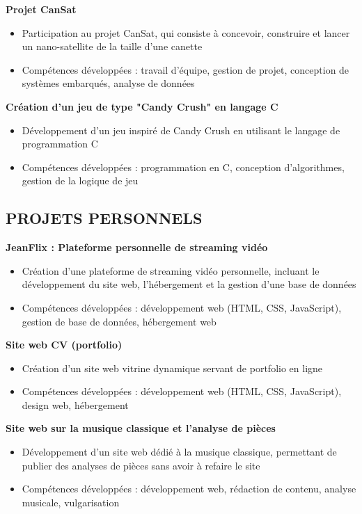 \documentclass{article}
\begin{document}
\textbf{Projet CanSat}
\begin{itemize}
\item Participation au projet CanSat, qui consiste à concevoir, construire et lancer un nano-satellite de la taille d'une canette
\item Compétences développées : travail d'équipe, gestion de projet, conception de systèmes embarqués, analyse de données
\end{itemize}

\textbf{Création d'un jeu de type "Candy Crush" en langage C}
\begin{itemize}
\item Développement d'un jeu inspiré de Candy Crush en utilisant le langage de programmation C
\item Compétences développées : programmation en C, conception d'algorithmes, gestion de la logique de jeu
\end{itemize}

\subsection{PROJETS PERSONNELS}
\textbf{JeanFlix : Plateforme personnelle de streaming vidéo}
\begin{itemize}
\item Création d'une plateforme de streaming vidéo personnelle, incluant le développement du site web, l'hébergement et la gestion d'une base de données
\item Compétences développées : développement web (HTML, CSS, JavaScript), gestion de base de données, hébergement web
\end{itemize}

\textbf{Site web CV (portfolio)}
\begin{itemize}
\item Création d'un site web vitrine dynamique servant de portfolio en ligne
\item Compétences développées : développement web (HTML, CSS, JavaScript), design web, hébergement
\end{itemize}

\textbf{Site web sur la musique classique et l'analyse de pièces}
\begin{itemize}
\item Développement d'un site web dédié à la musique classique, permettant de publier des analyses de pièces sans avoir à refaire le site
\item Compétences développées : développement web, rédaction de contenu, analyse musicale, vulgarisation
\end{itemize}
\end{document}
